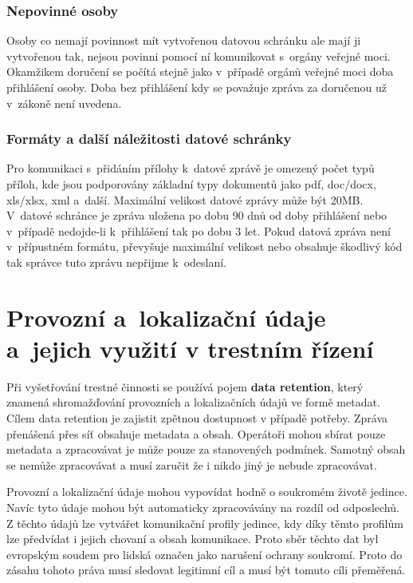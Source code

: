 \subsubsection{Nepovinné osoby}

Osoby co nemají povinnost mít vytvořenou datovou schránku ale mají ji vytvořenou tak, nejsou povinni pomocí ní komunikovat s~orgány veřejné moci. Okamžikem doručení se počítá stejně jako v~případě orgánů veřejné moci doba přihlášení osoby. Doba bez přihlášení kdy se považuje zpráva za doručenou už v~zákoně není uvedena.

\subsubsection{Formáty a další náležitosti datové schránky}

Pro komunikaci s~přidáním přílohy k~datové zprávě je omezený počet typů příloh, kde jsou podporovány základní typy dokumentů jako pdf, doc/docx, xls/xlsx, xml a~další. Maximální velikost datové zprávy může být 20MB. V~datové schránce je zpráva uložena po dobu 90 dnů od doby přihlášení nebo v~případě nedojde-li k~přihlášení tak po dobu 3 let. Pokud datová zpráva není v~přípustném formátu, převyšuje maximální velikost nebo obsahuje škodlivý kód tak správce tuto zprávu nepřijme k~odeslaní.













\clearpage
\section{Provozní a~lokalizační údaje a~jejich využití v trestním řízení}

Při vyšetřování trestné činnosti se používá pojem \textbf{data retention}, který znamená shromažďování provozních a lokalizačních údajů ve formě metadat. Cílem data retention je zajistit zpětnou dostupnost v případě potřeby. Zpráva přenášená přes síť obsahuje metadata a obsah. Operátoři mohou sbírat pouze metadata a zpracovávat je může pouze za stanovených podmínek. Samotný obsah se nemůže zpracovávat a musí zaručit že i nikdo jiný je nebude zpracovávat. 

Provozní a lokalizační údaje mohou vypovídat hodně o soukromém životě jedince. Navíc tyto údaje mohou být automaticky zpracovávány na rozdíl od odposlechů. Z těchto údajů lze vytvářet komunikační profily jedince, kdy díky těmto profilům lze předvídat i jejich chovaní a obsah komunikace. Proto sběr těchto dat byl evropským soudem pro lidská označen jako narušení ochrany soukromí. Proto do zásahu tohoto práva musí sledovat legitimní cíl a musí být tomuto cíli přeměřená.

